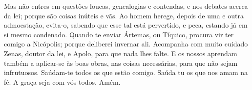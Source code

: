 Mas não entres em questões loucas, genealogias e contendas, e nos
debates acerca da lei; porque são coisas inúteis e vãs. Ao
homem herege, depois de uma e outra admoestação, evita-o,
sabendo que esse tal está pervertido, e peca, estando já em
si mesmo condenado. Quando te enviar Ártemas, ou Tíquico,
procura vir ter comigo a Nicópolis; porque deliberei invernar ali.
Acompanha com muito cuidado Zenas, doutor da lei, e Apolo,
para que nada lhes falte. E os nossos aprendam também a
aplicar-se às boas obras, nas coisas necessárias, para que não sejam
infrutuosos. Saúdam-te todos os que estão comigo. Saúda tu os
que nos amam na fé. A graça seja com vós todos. Amém.

